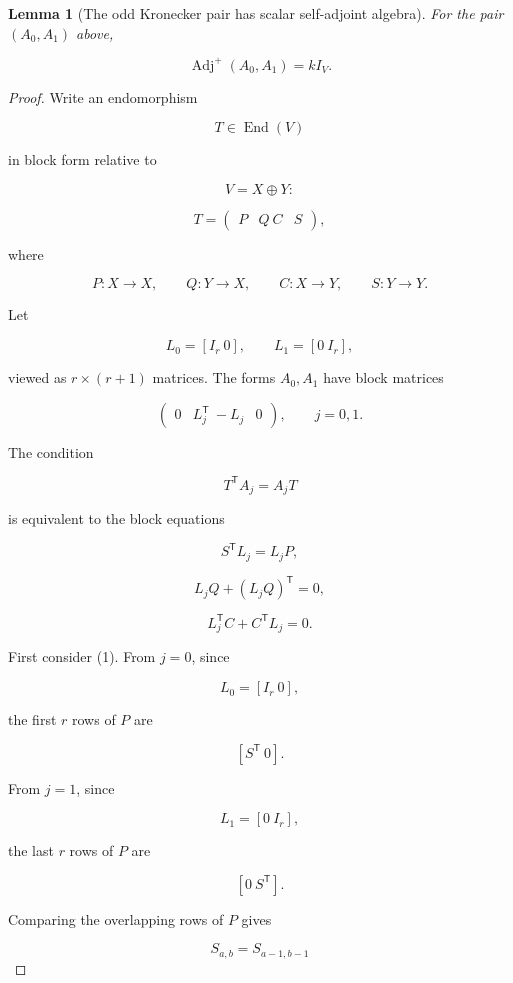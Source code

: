 \documentclass[11pt]{article}
\newtheorem{lemma}[theorem]{Lemma}
\begin{document}
\begin{lemma}[The odd Kronecker pair has scalar self-adjoint algebra]

For the pair $(A_0,A_1)$ above,

\[
\operatorname{Adj}^+(A_0,A_1)=kI_V.
\]

\end{lemma}

\begin{proof}

Write an endomorphism

\[
T\in\operatorname{End}(V)
\]

in block form relative to

\[
V=X\oplus Y:
\]

\[
T=
\begin{pmatrix}
P&Q\
C&S
\end{pmatrix},
\]

where

\[
P:X\to X,\qquad Q:Y\to X,\qquad C:X\to Y,\qquad S:Y\to Y.
\]

Let

\[
L_0=[I_r\ 0],
\qquad
L_1=[0\ I_r],
\]

viewed as $r\times(r+1)$ matrices. The forms $A_0,A_1$ have block matrices

\[
\begin{pmatrix}
0&L_j^{\mathsf T}\
-L_j&0
\end{pmatrix},
\qquad
j=0,1.
\]

The condition

\[
T^{\mathsf T}A_j=A_jT
\]

is equivalent to the block equations

\[
S^{\mathsf T}L_j=L_jP,
\tag{1}
\]

\[
L_jQ+(L_jQ)^{\mathsf T}=0,
\tag{2}
\]

\[
L_j^{\mathsf T}C+C^{\mathsf T}L_j=0.
\tag{3}
\]

First consider (1). From $j=0$, since

\[
L_0=[I_r\ 0],
\]

the first $r$ rows of $P$ are

\[
[S^{\mathsf T}\ 0].
\]

From $j=1$, since

\[
L_1=[0\ I_r],
\]

the last $r$ rows of $P$ are

\[
[0\ S^{\mathsf T}].
\]

Comparing the overlapping rows of $P$ gives

\[
S_{a,b}=S_{a-1,b-1}
\]


\end{proof}
\end{document}
